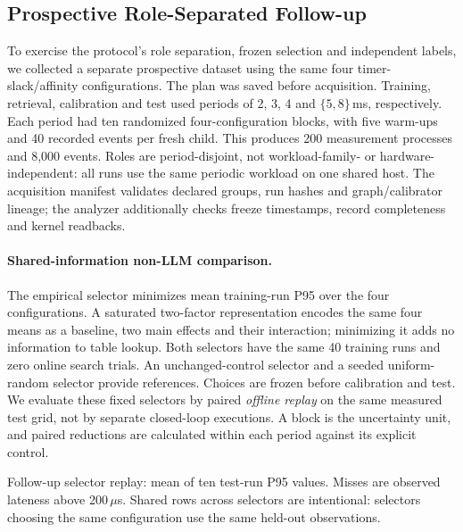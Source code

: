 \subsection{Prospective Role-Separated Follow-up}
\label{subsec:followup}
To exercise the protocol's role separation, frozen selection and independent labels, we collected a separate prospective dataset using the same four timer-slack/affinity configurations. The plan was saved before acquisition. Training, retrieval, calibration and test used periods of 2, 3, 4 and $\{5,8\}$\,ms, respectively. Each period had ten randomized four-configuration blocks, with five warm-ups and 40 recorded events per fresh child. This produces 200 measurement processes and 8,000 events. Roles are period-disjoint, not workload-family- or hardware-independent: all runs use the same periodic workload on one shared host. The acquisition manifest validates declared groups, run hashes and graph/calibrator lineage; the analyzer additionally checks freeze timestamps, record completeness and kernel readbacks.

\paragraph{Shared-information non-LLM comparison.}
The empirical selector minimizes mean training-run P95 over the four configurations. A saturated two-factor representation encodes the same four means as a baseline, two main effects and their interaction; minimizing it adds no information to table lookup. Both selectors have the same 40 training runs and zero online search trials. An unchanged-control selector and a seeded uniform-random selector provide references. Choices are frozen before calibration and test. We evaluate these fixed selectors by paired \emph{offline replay} on the same measured test grid, not by separate closed-loop executions. A block is the uncertainty unit, and paired reductions are calculated within each period against its explicit control.

\begin{table}[t]
\centering\small
\caption{Follow-up selector replay: mean of ten test-run P95 values. Misses are observed lateness above 200\,$\mu$s. Shared rows across selectors are intentional: selectors choosing the same configuration use the same held-out observations.}
\label{tab:controlled-selectors}
\begin{adjustbox}{max width=\columnwidth}

\end{adjustbox}
\end{table}

